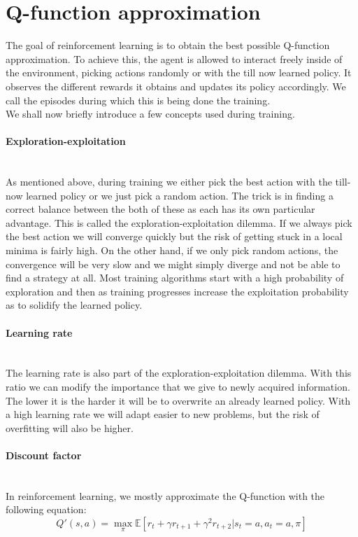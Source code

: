 \section{Q-function approximation} 
The goal of reinforcement learning is to obtain the best possible Q-function approximation. To achieve this, the agent is allowed to interact freely inside of the environment, picking actions randomly or with the till now learned policy. It observes the different rewards it obtains and updates its policy accordingly. We call the episodes during which this is being done the training.\\ 
We shall now briefly introduce a few concepts used during training.
\paragraph{Exploration-exploitation} \mbox{}\\
As mentioned above, during training we either pick the best action with the till-now learned policy or we just pick a random action. The trick is in finding a correct balance between the both of these as each has its own particular advantage. This is called the exploration-exploitation dilemma\cite{yogeswaran2012reinforcement}. If we always pick the best action we will converge quickly but the risk of getting stuck in a local minima is fairly high. On the other hand, if we only pick random actions, the convergence will be very slow and we might simply diverge and not be able to find a strategy at all. Most training algorithms start with a high probability of exploration and then as training progresses increase the exploitation probability as to solidify the learned policy.
\paragraph{Learning rate}\mbox{}\\
The learning rate is also part of the exploration-exploitation dilemma. With this ratio we can modify the importance that we give to newly acquired information. The lower it is the harder it will be to overwrite an already learned policy. With a high learning rate we will adapt easier to new problems, but the risk of overfitting will also be higher.

\paragraph{Discount factor}\mbox{}\\
In reinforcement learning, we mostly approximate the Q-function with the following equation:
\begin{equation}
	Q'(s,a) = \max_{\pi} \mathbb{E}[r_t+\gamma r_{t+1}+\gamma^2 r_{t+2}| s_t=a, a_t = a,\pi]
\end{equation}

